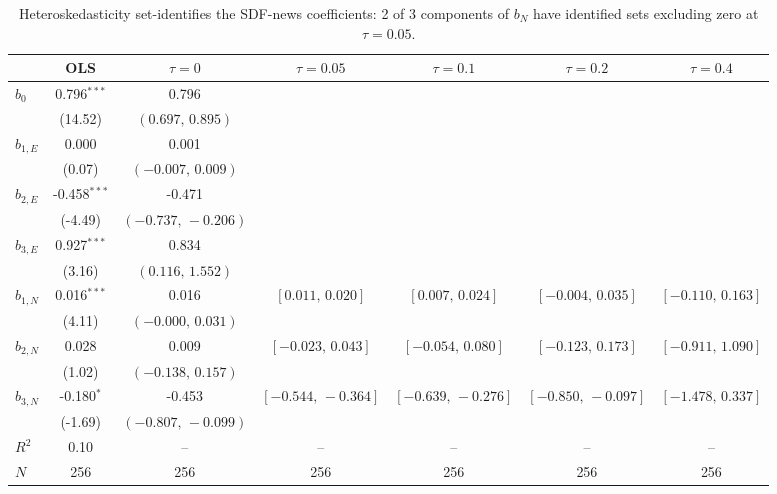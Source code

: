 \begin{table}[!htbp]
\centering
\begin{threeparttable}
\caption{Heteroskedasticity set-identifies the SDF-news coefficients: 2 of 3 components of $b_N$ have identified sets excluding zero at $\tau{=}0.05$.}
\label{tab:structural_eq_set_id}
\footnotesize\setlength{\tabcolsep}{3pt}
\begin{tabular}{lcccccc}
\toprule
 & OLS & $\tau{=}0$ & $\tau{=}0.05$ & $\tau{=}0.1$ & $\tau{=}0.2$ & $\tau{=}0.4$ \\
\midrule
$b_0$ & 0.796$^{***}$ & 0.796 &  &  &  &  \\
 & (14.52) & $(0.697,\,0.895)$ &  &  &  &  \\
$b_{1,E}$ & 0.000 & 0.001 &  &  &  &  \\
 & (0.07) & $(-0.007,\,0.009)$ &  &  &  &  \\
$b_{2,E}$ & -0.458$^{***}$ & -0.471 &  &  &  &  \\
 & (-4.49) & $(-0.737,\,-0.206)$ &  &  &  &  \\
$b_{3,E}$ & 0.927$^{***}$ & 0.834 &  &  &  &  \\
 & (3.16) & $(0.116,\,1.552)$ &  &  &  &  \\
\midrule
$b_{1,N}$ & 0.016$^{***}$ & 0.016 & $[0.011,\,0.020]$ & $[0.007,\,0.024]$ & $[-0.004,\,0.035]$ & $[-0.110,\,0.163]$ \\
 & (4.11) & $(-0.000,\,0.031)$ &  &  &  &  \\
$b_{2,N}$ & 0.028 & 0.009 & $[-0.023,\,0.043]$ & $[-0.054,\,0.080]$ & $[-0.123,\,0.173]$ & $[-0.911,\,1.090]$ \\
 & (1.02) & $(-0.138,\,0.157)$ &  &  &  &  \\
$b_{3,N}$ & -0.180$^{*}$ & -0.453 & $[-0.544,\,-0.364]$ & $[-0.639,\,-0.276]$ & $[-0.850,\,-0.097]$ & $[-1.478,\,0.337]$ \\
 & (-1.69) & $(-0.807,\,-0.099)$ &  &  &  &  \\
\midrule
$R^2$ & 0.10 & -- & -- & -- & -- & -- \\
$N$ & 256 & 256 & 256 & 256 & 256 & 256 \\
\bottomrule
\end{tabular}
\begin{tablenotes}[flushleft]
\scriptsize

\end{tablenotes}
\end{threeparttable}
\end{table}
